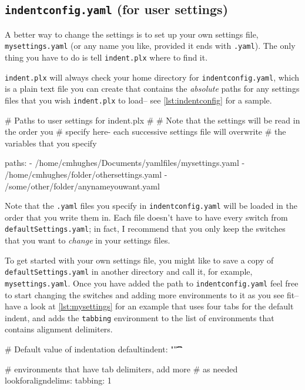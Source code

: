 \documentclass[11pt]{article}
\begin{document}
\subsection{\lstinline!indentconfig.yaml! (for user settings)}\label{sec:indentconfig}
A better way to change the settings is to set up your own settings file, 
\lstinline!mysettings.yaml! (or any name you like, provided it ends with \lstinline!.yaml!). 
The only thing you have to do is tell \lstinline!indent.plx! where to find it. 

\lstinline!indent.plx! will always check your home directory for \lstinline!indentconfig.yaml!, 
which is a plain text file you can create that contains the \emph{absolute}
paths for any settings files that you wish \lstinline!indent.plx! to load-- see
\cref{lst:indentconfig} for a sample.

\begin{yaml}[caption={\lstinline!indentconfig.yaml!},label={lst:indentconfig}]
# Paths to user settings for indent.plx
#
# Note that the settings will be read in the order you 
# specify here- each successive settings file will overwrite
# the variables that you specify

paths:
- /home/cmhughes/Documents/yamlfiles/mysettings.yaml
- /home/cmhughes/folder/othersettings.yaml
- /some/other/folder/anynameyouwant.yaml
\end{yaml}

Note that the \lstinline!.yaml! files you specify in \lstinline!indentconfig.yaml!
will be loaded in the order that you write them in. Each file doesn't have 
to have every switch from \lstinline!defaultSettings.yaml!; in fact, I recommend 
that you only keep the switches that you want to \emph{change} in your 
settings files.

To get started with your own settings file, you might like to save a copy of 
\lstinline!defaultSettings.yaml! in another directory and call it, for 
example, \lstinline!mysettings.yaml!. Once you have added the path to \lstinline!indentconfig.yaml!
feel free to start changing the switches and adding more environments to it 
as you see fit-- have a look at \cref{lst:mysettings} for an example 
that uses four tabs for the default indent, and adds the \lstinline!tabbing!
environment to the list of environments that contains alignment delimiters.

\begin{yaml}[caption={\lstinline!mysettings.yaml! (example)},label={lst:mysettings}]
# Default value of indentation
defaultindent: "\t\t\t\t"

# environments that have tab delimiters, add more 
# as needed
lookforaligndelims:
   tabbing: 1
\end{yaml}
\end{document}
